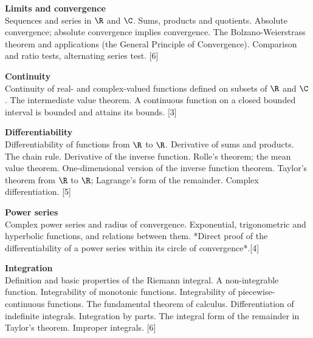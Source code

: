 \documentclass[a4paper]{article}
\begin{document}
\maketitle
{\small
\noindent\textbf{Limits and convergence}\\
Sequences and series in $\R$ and $\C$. Sums, products and quotients. Absolute convergence; absolute convergence implies convergence. The Bolzano-Weierstrass theorem and applications (the General Principle of Convergence). Comparison and ratio tests, alternating series test.\hspace*{\fill} [6]

\vspace{10pt}
\noindent\textbf{Continuity}\\
Continuity of real- and complex-valued functions defined on subsets of $\R$ and $\C$. The intermediate value theorem. A continuous function on a closed bounded interval is bounded and attains its bounds.\hspace*{\fill} [3]

\vspace{10pt}
\noindent\textbf{Differentiability}\\
Differentiability of functions from $\R$ to $\R$. Derivative of sums and products. The chain rule. Derivative of the inverse function. Rolle's theorem; the mean value theorem. One-dimensional version of the inverse function theorem. Taylor's theorem from $\R$ to $\R$; Lagrange's form of the remainder. Complex differentiation.\hspace*{\fill} [5]

\vspace{10pt}
\noindent\textbf{Power series}\\
Complex power series and radius of convergence. Exponential, trigonometric and hyperbolic functions, and relations between them. *Direct proof of the differentiability of a power series within its circle of convergence*.\hspace*{\fill}[4]

\vspace{10pt}
\noindent\textbf{Integration}\\
Definition and basic properties of the Riemann integral. A non-integrable function. Integrability of monotonic functions. Integrability of piecewise-continuous functions. The fundamental theorem of calculus. Differentiation of indefinite integrals. Integration by parts. The integral form of the remainder in Taylor's theorem. Improper integrals.\hspace*{\fill} [6]}
\end{document}
